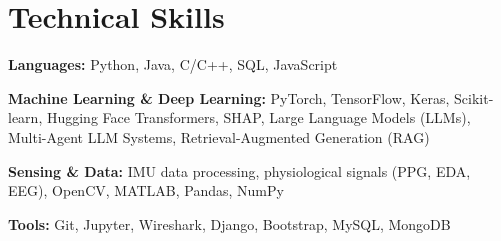 \documentclass[10pt, letterpaper]{article}
\begin{document}
\section{Technical Skills}

\textbf{Languages:} Python, Java, C/C++, SQL, JavaScript

\textbf{Machine Learning \& Deep Learning:} PyTorch, TensorFlow, Keras, Scikit-learn, Hugging Face Transformers, SHAP, Large Language Models (LLMs), Multi-Agent LLM Systems, Retrieval-Augmented Generation (RAG)

\textbf{Sensing \& Data:} IMU data processing, physiological signals (PPG, EDA, EEG), OpenCV, MATLAB, Pandas, NumPy

\textbf{Tools:} Git, Jupyter, Wireshark, Django, Bootstrap, MySQL, MongoDB
\end{document}
